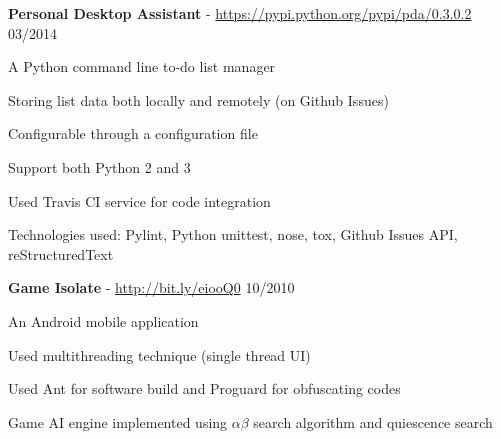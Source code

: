 \documentclass[margin,line]{resume}
\begin{document}
\begin{resume}
    \textbf{Personal Desktop Assistant} - \url{https://pypi.python.org/pypi/pda/0.3.0.2} \hfill 03/2014 \vspace{-3mm}\\\vspace{-1mm}%
      \begin{list2}
       \item A Python command line to-do list manager
       \item Storing list data both locally and remotely (on Github Issues)
       \item Configurable through a configuration file
       \item Support both Python 2 and 3
       \item Used Travis CI service for code integration
       \item Technologies used: Pylint, Python unittest, nose, tox, Github Issues API, reStructuredText
      \end{list2}

    \textbf{Game Isolate} - \url{http://bit.ly/eiooQ0} \hfill 10/2010 \vspace{-3mm}\\\vspace{-1mm}%
      \begin{list2}
       \item An Android mobile application
       \item Used multithreading technique (single thread UI)
       \item Used Ant for software build and Proguard for obfuscating codes
       \item Game AI engine implemented using $\alpha \beta$ search algorithm and quiescence search
      \end{list2}

\end{resume}
\end{document}

